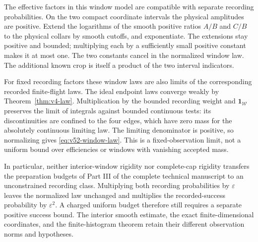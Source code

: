 The effective factors in this window model are compatible with separate
recording probabilities.  On the two compact coordinate intervals the
physical amplitudes are positive.  Extend the logarithms of the smooth
positive ratios $A/B$ and $C/B$ to the physical collars by smooth cutoffs,
and exponentiate.  The extensions stay positive and bounded; multiplying
each by a sufficiently small positive constant makes it at most one.
The two constants cancel in the normalized window law.  The additional
known crop is itself a product of the two interval indicators.

For fixed recording factors these window laws are also limits of the
corresponding recorded finite-flight laws.  The ideal endpoint laws
converge weakly by Theorem~\ref{thm:v4-law}.  Multiplication by the
bounded recording weight and $\mathbf1_{\mathcal W}$ preserves the
limit of integrals against bounded continuous tests: its discontinuities
are confined to the four edges, which have zero mass for the absolutely
continuous limiting law.  The limiting denominator is positive, so
normalizing gives \eqref{eq:v52-window-law}.  This is a fixed-observation
limit, not a uniform bound over efficiencies or windows with vanishing
accepted mass.

In particular, neither interior-window rigidity nor complete-cap rigidity
transfers the preparation budgets of Part III of the complete technical manuscript to an unconstrained
recording class.  Multiplying both recording probabilities by
$\varepsilon$ leaves the normalized law unchanged and multiplies the
recorded-success probability by $\varepsilon^2$.  A charged uniform
budget therefore still requires a separate positive success bound.
The interior smooth estimate, the exact finite-dimensional coordinates,
and the finite-histogram theorem retain their different observation
norms and hypotheses.
